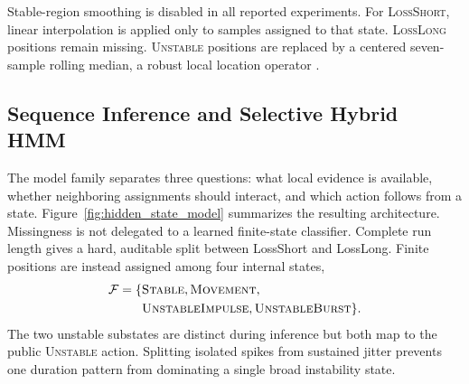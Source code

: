 \documentclass[sigconf,review]{acmart}
\begin{document}
Stable-region smoothing is disabled in all reported experiments. For \textsc{LossShort}, linear interpolation is applied only to samples assigned to that state. \textsc{LossLong} positions remain missing. \textsc{Unstable} positions are replaced by a centered seven-sample rolling median, a robust local location operator \cite{huber2009robust}.

\subsection{Sequence Inference and Selective Hybrid HMM}
\label{sec:hidden_state}

The model family separates three questions: what local evidence is available, whether neighboring assignments should interact, and which action follows from a state. Figure~\ref{fig:hidden_state_model} summarizes the resulting architecture. Missingness is not delegated to a learned finite-state classifier. Complete run length gives a hard, auditable split between LossShort and LossLong. Finite positions are instead assigned among four internal states,
\[
\begin{aligned}
\mathcal F=\{&\textsc{Stable},\textsc{Movement},\\
              &\textsc{UnstableImpulse},\textsc{UnstableBurst}\}.
\end{aligned}
\]
The two unstable substates are distinct during inference but both map to the public \textsc{Unstable} action. Splitting isolated spikes from sustained jitter prevents one duration pattern from dominating a single broad instability state.
\end{document}
